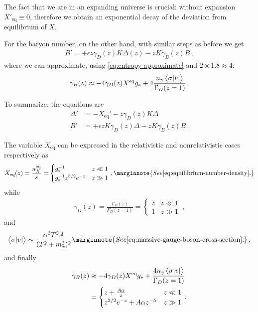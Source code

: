 \documentclass[main.tex]{subfiles}
\begin{document}
The fact that we are in an expanding universe is crucial: without expansion \(X' _{\text{eq}} \equiv 0\), therefore we obtain an exponential decay of the deviation from equilibrium of \(X\). 

For the baryon number, on the other hand, with similar steps as before we get 
%
\begin{align}
B' = + \epsilon z \gamma _D (z) K \Delta (z) - z K \gamma _B (z) B 
\,,
\end{align}
%
where we can approximate, using \eqref{eq:entropy-approximate} and \(2 \times 1.8 \approx 4\):
%
\begin{align}
\gamma _B (z) \approx - 4 \gamma _D (z) X^{\text{eq}} g_* + 4 \frac{n_\gamma \expval{\sigma \abs{v}}}{\Gamma _D (z=1)}
\,.
\end{align}

To summarize, the equations are 
%
\begin{align}
\Delta' &= - X _{\text{eq}}' - z \gamma _D (z) K \Delta  \\
B' &= + \epsilon z K \gamma _D (z) \Delta - z K \gamma _B (z) B
\,.
\end{align}

The variable \(X _{\text{eq}}\) can be expressed in the relativistic and nonrelativistic cases respectively as 
%
\begin{align}
X _{\text{eq}} (z) = \frac{n_X^{\text{eq}}}{s} = \begin{cases}
    g_*^{-1} & z\ll 1  \\
    g_*^{-1}z^{3/2} e^{-z} & z \gg 1 
\end{cases}
\,,
\marginnote{See \eqref{eq:equilibrium-number-density}.}
\end{align}
%
while 
%
\begin{align}
\gamma _D (z) = \frac{\Gamma _D(z)}{\Gamma _D(z=1)} = \begin{cases}
    z & z\ll 1  \\
    1 & z\gg 1
\end{cases}
\,,
\end{align}
%
and 
%
\begin{align}
\expval{ \sigma \abs{v}} \sim \frac{\alpha^2 T^2 A}{(T^2 +m_x^2)^2}
\marginnote{See \eqref{eq:massive-gauge-boson-cross-section}.}
\,,
\end{align}
%
and finally
%
\begin{align} \label{eq:gamma-B-boltzmann}
\gamma _B (z) &\approx -4 \gamma _D (z) X^{\text{eq}} g_* + \frac{4 n_\gamma \expval{ \sigma \abs{v}}}{\Gamma _D (z=1)}  \\
&= \begin{cases}
    z + \frac{A \alpha }{z} & z \ll 1  \\
    z^{3/2} e^{-z} + A \alpha z^{-5} & z \gg 1
\end{cases}
\,.
\end{align}
\end{document}
